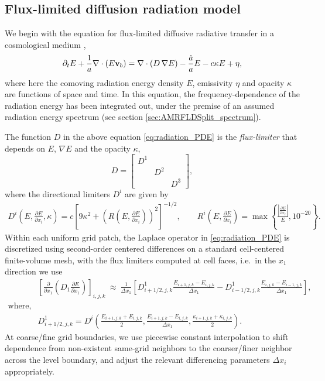 \documentclass[letterpaper,10pt]{article}
\renewcommand{\(}{\left(}
\renewcommand{\)}{\right)}
\newcommand{\vb}{{\bf v}_b}
\begin{document}
\subsection{Flux-limited diffusion radiation model}
\label{sec:rad_model}

We begin with the equation for flux-limited diffusive radiative
transfer in a cosmological medium \cite{ReynoldsHayesPaschosNorman2009},
\begin{equation}
\label{eq:radiation_PDE}
  \partial_{t} E + \frac1a \nabla\cdot\(E\vb\) =
    \nabla\cdot\(D\,\nabla E\) - \frac{\dot{a}}{a} E - c\kappa E + \eta,
\end{equation}
where here the comoving radiation energy density $E$, emissivity
$\eta$ and opacity $\kappa$ are functions of space and time.  In this
equation, the frequency-dependence of the radiation energy has been
integrated out, under the premise of an assumed radiation energy
spectrum (see section \ref{sec:AMRFLDSplit_spectrum}).

The function $D$ in the above equation \eqref{eq:radiation_PDE} is
the {\em flux-limiter} that depends on $E$, $\nabla E$ and the 
opacity $\kappa$,  
\[
   D = \left[\begin{array}{ccc} D^{1} & & \\ & D^{2} & \\ & & D^{3} \end{array}\right],
\]
where the directional limiters $D^i$ are given by \cite{Morel2000}
\begin{align}
  \label{eq:Larsen_limiter}
   D^{i}\left(E,\tfrac{\partial E}{\partial x_i},\kappa\right) = 
     c \left[ 9\kappa^2 + 
     \left(R\left(E,\tfrac{\partial E}{\partial x_i}\right)\right)^2\right]^{-1/2}, \qquad
   R^i\left(E,\tfrac{\partial E}{\partial x_i}\right) = 
     \max\left\{\frac{\left|\tfrac{\partial E}{\partial x_i} \right|}{E}, 10^{-20} \right\}. 
\end{align}
Within each uniform grid patch, the Laplace operator in
\eqref{eq:radiation_PDE} is discretized using second-order centered
differences on a standard cell-centered finite-volume mesh, with the
flux limiters computed at cell faces, i.e.~in the $x_1$ direction we
use 
\begin{align*}
  &\left[\frac{\partial}{\partial x_1}\left(D_1
    \frac{\partial E}{\partial x_1}\right)\right]_{i,j,k} \ \approx \ 
  \frac{1}{\Delta x_1} \left[
    D^1_{i+1/2,j,k}\frac{E_{i+1,j,k}-E_{i,j,k}}{\Delta x_1} -
    D^1_{i-1/2,j,k}\frac{E_{i,j,k}-E_{i-1,j,k}}{\Delta x_1} \right],\\
  \text{where, e.g.} & \\
  & D^1_{i+1/2,j,k} = D^{i}\left(
     \tfrac{E_{i+1,j,k}+E_{i,j,k}}{2},
     \tfrac{E_{i+1,j,k}-E_{i,j,k}}{\Delta x_1},
     \tfrac{\kappa_{i+1,j,k}+\kappa_{i,j,k}}{2}\right).
\end{align*}
At coarse/fine grid boundaries, we use piecewise constant
interpolation to shift dependence from non-existent same-grid
neighbors to the coarser/finer neighbor across the level boundary,
and adjust the relevant differencing parameters $\Delta x_i$
appropriately. 
\end{document}
